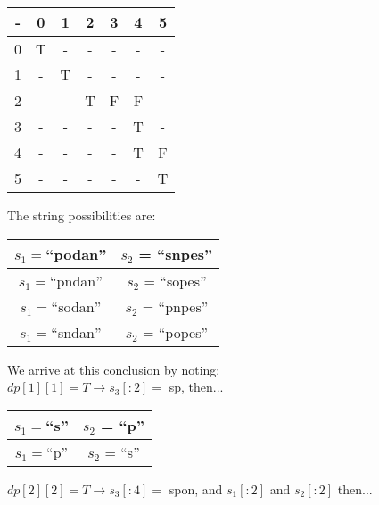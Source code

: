 \documentclass[11pt]{article}
\begin{document}
\begin{enumerate}[(a)]
\begin{enumerate}[(i)]
        \begin{center}
            \begin{tabular}{ |c|c|c|c|c|c|c| } 
            \hline
            - & 0 & 1 & 2 & 3 & 4 & 5 \\ 
            \hline
            0 & T & - & - & - & - & -\\ 
            \hline
            1 & - & T & - & - & - & - \\ 
            \hline
            2 & - & - & T & F & F & - \\ 
            \hline
            3 & - & - & - & - & T & - \\ 
            \hline
            4 & - & - & - & - & T & F \\  
            \hline
            5 & - & - & - & - & - & T \\ 
            \hline
            \end{tabular}
        \end{center}
        \begin{solution}
            The string possibilities are:
            \begin{center}
                \begin{tabular}{ |c|c| } 
                \hline
                 $s_1 = $``podan'' & $s_2$ = ``snpes'' \\ 
                \hline
                $s_1 = $``pndan'' & $s_2$ = ``sopes'' \\ 
                \hline
                $s_1 = $``sodan'' & $s_2$ = ``pnpes'' \\ 
                \hline
                $s_1 = $``sndan'' & $s_2$ = ``popes'' \\ 
                \hline
                \end{tabular}
            \end{center}
            We arrive at this conclusion by noting: \\
            $dp[1][1]=T \rightarrow s_3[:2] =$ sp, then...
            \begin{center}
                \begin{tabular}{ |c|c| } 
                \hline
                 $s_1 = $``s'' & $s_2$ = ``p'' \\ 
                 \hline
                 $s_1 = $``p'' & $s_2$ = ``s'' \\ 
                \hline
                \end{tabular}
            \end{center}
            $dp[2][2]=T \rightarrow s_3[:4] =$ spon, and $s_1[:2]$ and $s_2[:2]$ then...

\end{solution}
\end{enumerate}
\end{enumerate}
\end{document}
